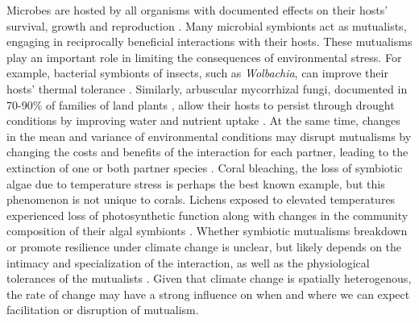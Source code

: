 \documentclass[11pt]{article}
\begin{document}
Microbes are hosted by all organisms with documented effects on their hosts' survival, growth and reproduction \cite{rodriguez2009fungal,mcfall2013animals}.
Many microbial symbionts act as mutualists, engaging in reciprocally beneficial interactions with their hosts. 
These mutualisms play an important role in limiting the consequences of environmental stress. 
For example, bacterial symbionts of insects, such as \emph{Wolbachia}, can improve their hosts' thermal tolerance \citep{truitt2019wolbachia, renoz2019evolutionary}. Similarly, arbuscular mycorrhizal fungi, documented in 70-90\% of families of land plants \citep{parniske2008arbuscular}, allow their hosts to persist through drought conditions by improving water and nutrient uptake \citep{cheng2021elucidating}.
At the same time, changes in the mean and variance of environmental conditions may disrupt mutualisms by changing the costs and benefits of the interaction for each partner, leading to the extinction of one or both partner species \citep{aslan2013mutualism}. 
Coral bleaching, the loss of symbiotic algae due to temperature stress \citep{sully2019global} is perhaps the best known example, but this phenomenon is not unique to corals.
Lichens exposed to elevated temperatures experienced loss of photosynthetic function along with changes in the community composition of their algal symbionts \citep{meyer2022climate}.
Whether symbiotic mutualisms breakdown or promote resilience under climate change is unclear, but likely depends on the intimacy and specialization of the interaction, as well as the physiological tolerances of the mutualists \citep{toby2010mutualisms, warren2014mutualism, rafferty2015phenological}. 
Given that climate change is spatially heterogenous, the rate of change may have a strong influence on when and where we can expect facilitation or disruption of mutualism. 
\end{document}
